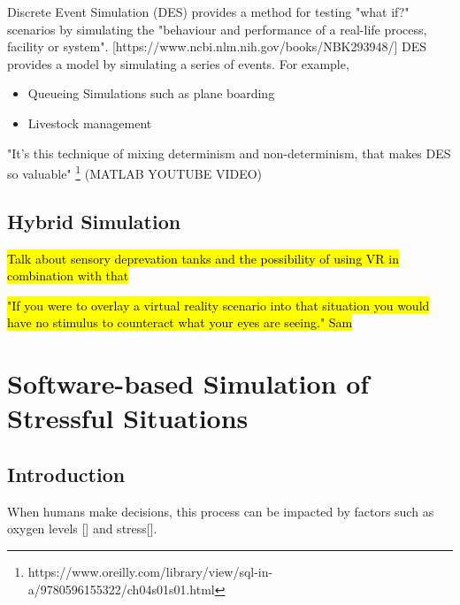 \documentclass{article}
\begin{document}
Discrete Event Simulation (DES) provides a method for testing "what if?" scenarios by simulating the "behaviour and performance of a real-life process, facility or system". [https://www.ncbi.nlm.nih.gov/books/NBK293948/] DES provides a model by simulating a series of events. For example, 

\begin{itemize}
  \item Queueing Simulations such as plane boarding
  \item Livestock management
\end{itemize}

"It's this technique of mixing determinism and non-determinism, that makes DES so valuable" \footnote{https://www.oreilly.com/library/view/sql-in-a/9780596155322/ch04s01s01.html} (MATLAB YOUTUBE VIDEO)


\subsection{Hybrid Simulation}


\hl{Talk about sensory deprevation tanks and the possibility of using VR in combination with that}

\hl{"If you were to overlay a virtual reality scenario into that situation you would have no stimulus to counteract what your eyes are seeing." Sam}


\section{Software-based Simulation of Stressful Situations}

\subsection{Introduction}

When humans make decisions, this process can be impacted by factors such as oxygen levels [] and stress[].



\end{document}
